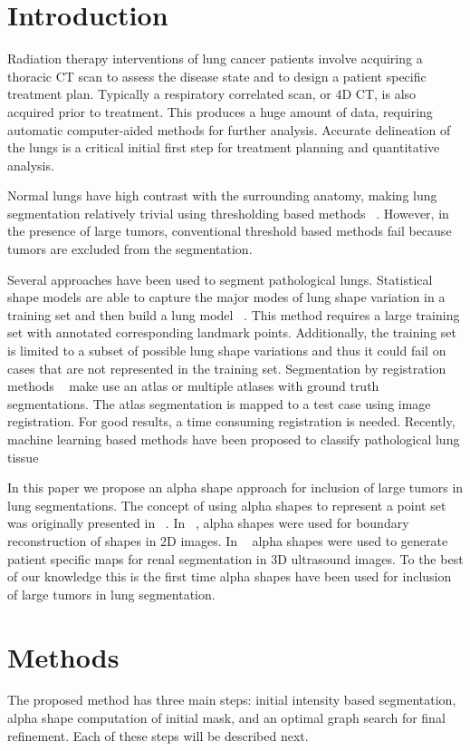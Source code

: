 \documentclass{llncs}
\begin{document}
\section{Introduction}
%
Radiation therapy interventions of lung cancer patients involve acquiring a thoracic CT scan to assess the disease state and to design a patient specific treatment plan. Typically a respiratory correlated scan, or 4D CT, is also acquired prior to treatment. This produces a huge amount of data, requiring automatic computer-aided methods for further analysis. Accurate delineation of the lungs is a critical initial first step for treatment planning and quantitative analysis.

Normal lungs have high contrast with the surrounding anatomy, making lung segmentation relatively trivial using thresholding based methods ~\cite{guo2008,hu2001}. However, in the presence of large tumors, conventional threshold based methods fail because tumors are excluded from the segmentation. 

Several approaches have been used to segment pathological lungs. Statistical shape models are able to capture the major modes of lung shape variation in a training set and then build a lung model ~\cite{sun2012,sofka2011}. This method requires a large training set with annotated corresponding landmark points. Additionally, the training set is limited to a subset of possible lung shape variations and thus it could fail on cases that are not represented in the training set. Segmentation by registration methods ~\cite{sluimer2005,vanrikxoort2009} make use an atlas or multiple atlases with ground truth segmentations. The atlas segmentation is mapped to a test case using image registration. For good results, a time consuming registration is needed. Recently, machine learning based methods have been proposed to classify pathological lung tissue ~\cite{song2012,mansoor2014}

In this paper we propose an alpha shape approach for inclusion of large tumors in lung segmentations. The concept of using alpha shapes to represent a point set was originally presented in ~\cite{edelsbrunner1983}. In ~\cite{stelldinger2006}, alpha shapes were used for boundary reconstruction of shapes in 2D images. In ~\cite{cerrolaza2015} alpha shapes were used to generate patient specific maps for renal segmentation in 3D ultrasound images. To the best of our knowledge this is the first time alpha shapes have been used for inclusion of large tumors in lung segmentation. 


%
\section{Methods}
%
The proposed method has three main steps: initial intensity based segmentation, alpha shape computation of initial mask, and an optimal graph search for final refinement. Each of these steps will be described next.
%
\end{document}
